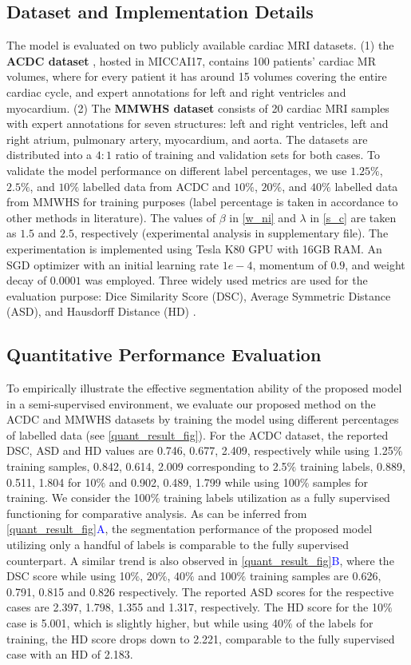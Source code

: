 \documentclass[runningheads]{llncs}
\begin{document}
\subsection{Dataset and Implementation Details}
The model is evaluated on two publicly available cardiac MRI datasets. (1) the \textbf{ACDC dataset} \cite{bernard2018deep}, hosted in MICCAI17, contains 100 patients' cardiac MR volumes, where for every patient it has around 15 volumes covering the entire cardiac cycle, and expert annotations for left and right ventricles and myocardium. (2) The \textbf{MMWHS dataset} \cite{zhuang2016multi} consists of 20 cardiac MRI samples with expert annotations for seven structures: left and right ventricles, left and right atrium, pulmonary artery, myocardium, and aorta. The datasets are distributed into a $4:1$ ratio of training and validation sets for both cases. To validate the model performance on different label percentages, we use $1.25\%$, $2.5\%$, and $10\%$ labelled data from ACDC and $10\%$, $20\%$, and $40\%$ labelled data from MMWHS for training purposes (label percentage is taken in accordance to other methods in literature). The values of $\beta$ in \autoref{w_ni} and $\lambda$ in \autoref{s_c} are taken as $1.5$ and $2.5$, respectively (experimental analysis in supplementary file). The experimentation is implemented using Tesla K80 GPU with 16GB RAM. An SGD optimizer with an initial learning rate $1e-4$, momentum of $0.9$, and weight decay of $0.0001$ was employed. Three widely used metrics are used for the evaluation purpose: Dice Similarity Score (DSC), Average Symmetric Distance (ASD), and Hausdorff Distance (HD) \cite{basak2022embarrassingly}. 

\subsection{Quantitative Performance Evaluation}
To empirically illustrate the effective segmentation ability of the proposed model in a semi-supervised environment, we evaluate our proposed method on the ACDC and MMWHS datasets by training the model using different percentages of labelled data (see \autoref{quant_result_fig}). For the ACDC dataset, the reported DSC, ASD and HD values are 0.746, 0.677, 2.409, respectively while using 1.25$\%$ training samples, 0.842, 0.614, 2.009 corresponding to 2.5$\%$ training labels, 0.889, 0.511, 1.804 for 10$\%$ and 0.902, 0.489, 1.799 while using 100$\%$ samples for training. We consider the 100$\%$ training labels utilization as a fully supervised functioning for comparative analysis. As can be inferred from \autoref{quant_result_fig}\textcolor{blue}{A}, the segmentation performance of the proposed model utilizing only a handful of labels is comparable to the fully supervised counterpart. A similar trend is also observed in \autoref{quant_result_fig}\textcolor{blue}{B}, where the DSC score while using 10$\%$, 20$\%$, 40$\%$ and 100$\%$ training samples are 0.626, 0.791, 0.815 and 0.826 respectively. The reported ASD scores for the respective cases are 2.397, 1.798, 1.355 and 1.317, respectively. The HD score for the 10$\%$ case is 5.001, which is slightly higher, but while using 40$\%$ of the labels for training, the HD score drops down to 2.221, comparable to the fully supervised case with an HD of 2.183.
\end{document}

